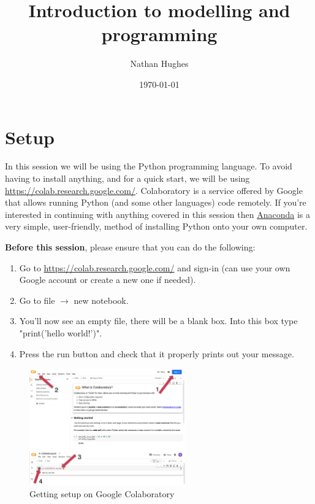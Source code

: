 \documentclass[12pt]{article}
\title{Introduction to modelling and programming}
\author{Nathan Hughes}
\date{\today}
\begin{document}
\maketitle

\section{Setup}


In this session we will be using the Python programming language. To avoid having to install anything, and for a quick start, we will be using \url{https://colab.research.google.com/}. Colaboratory is a service offered by Google that allows running Python (and some other languages) code remotely. If you're interested in continuing with anything covered in this session then \href{https://www.anaconda.com}{Anaconda} is a very simple, user-friendly, method of installing Python onto your own computer. 

\textbf{Before this session}, please ensure that you can do the following: 

\begin{enumerate}
    \item Go to \url{https://colab.research.google.com/} and sign-in (can use your own Google account or create a new one if needed).
    \item Go to file $\rightarrow$ new notebook.
    \item You'll now see an empty file, there will be a blank box. Into this box type "print('hello world!')".
    \item Press the run button and check that it properly prints out your message. 
\end{enumerate}

\begin{figure}[!h]
    \centering
    \includegraphics[width=0.6\textwidth]{./figures/ssIM1.png}
    \caption{Getting setup on Google Colaboratory}
\end{figure}
\end{document}
